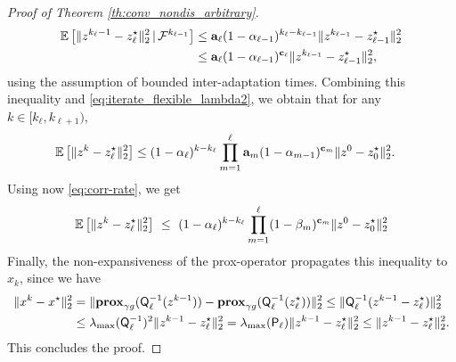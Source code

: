 \begin{proof}[Proof of Theorem \ref{th:conv_nondis_arbitrary}]
\begin{align}
  \nonumber  \mathbb{E}\left[\|z^{k_\ell-1}-z^{\star}_{\ell}\|_2^2\,|\,\mathcal{F}^{k_{\ell-1}}\right] &\leq  \mathbf{a}_\ell  (1-\alpha_{\ell-1})^{k_{\ell}-k_{\ell-1}} \|z^{k_{\ell-1}}-z^{\star}_{\ell-1}\|_2^2 \\
   &\leq  \mathbf{a}_\ell  (1-\alpha_{\ell-1})^{\mathbf{c}_\ell} \|z^{k_{\ell-1}}-z^{\star}_{\ell-1}\|_2^2,
\end{align} 
using the assumption of bounded inter-adaptation times.
Combining this inequality and \eqref{eq:iterate_flexible_lambda2}, we obtain that for any $k\in[k_\ell,k_{\ell+1})$, 
\begin{align*}
    \mathbb{E}\left[\|z^{k}-z^{\star}_{\ell}\|_2^2\right] &\leq (1-\alpha_\ell)^{k-k_\ell}
    \prod_{m=1}^\ell  \mathbf{a}_m (1-\alpha_{m-1})^{\mathbf{c}_m} \|z^{0}-z^{\star}_{0}\|_2^2.
    \end{align*}
Using now \eqref{eq:corr-rate}, we get    
\[
\mathbb{E}\left[\|z^{k}-z^{\star}_{\ell}\|_2^2\right] ~\leq~ (1-\alpha_\ell)^{k-k_\ell}
    \prod_{m=1}^\ell  (1-\beta_{m})^{\mathbf{c}_m} \|z^{0}-z^{\star}_{0}\|_2^2
\]
Finally, the non-expansiveness of the prox-operator propagates this inequality to $x_k$, since we have 
\begin{align*}
\|x^k - x^\star\|_2^2 &= \|\prox_{\gamma g}(\bQ_\ell^{-1}(z^{k-1})) - \prox_{\gamma g}(\bQ_\ell^{-1}(z_\ell^\star))\|_2^2
\leq
\|\bQ_\ell^{-1}(z^{k-1} - z_\ell^\star)\|_2^2 \\
&\leq \lambda_{\max}(\bQ_\ell^{-1})^2  \|z^{k-1}-z^\star_\ell\|_2^2 =  %
\lambda_{\max}(\bP_\ell)  \|z^{k-1}-z^\star_\ell\|_2^2 \leq \|z^{k-1}-z^\star_\ell\|_2^2.
\end{align*}
This concludes the proof.
\end{proof}


